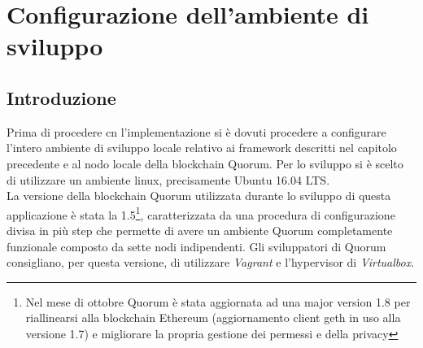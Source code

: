 %
%
\chapter{Configurazione dell'ambiente di sviluppo} %
%
\label{cap:configurazione}
%
\section{Introduzione}
Prima di procedere cn l'implementazione si è dovuti procedere a configurare l'intero ambiente di sviluppo locale relativo ai framework descritti nel capitolo precedente e al nodo locale della blockchain Quorum. Per lo sviluppo si è scelto di utilizzare un ambiente linux, precisamente Ubuntu 16.04 LTS. \\
La versione della blockchain Quorum utilizzata durante lo sviluppo di questa applicazione è stata la 1.5\footnote{Nel mese di ottobre Quorum è stata aggiornata ad una major version 1.8 per riallinearsi alla blockchain Ethereum (aggiornamento client geth in uso alla versione 1.7) e migliorare la propria gestione dei permessi e della privacy}, caratterizzata da una procedura di configurazione divisa in più step che permette di avere un ambiente Quorum completamente funzionale composto da sette nodi indipendenti. Gli sviluppatori di Quorum consigliano, per questa versione, di utilizzare \emph{Vagrant} e l'hypervisor di \emph{Virtualbox}.%
